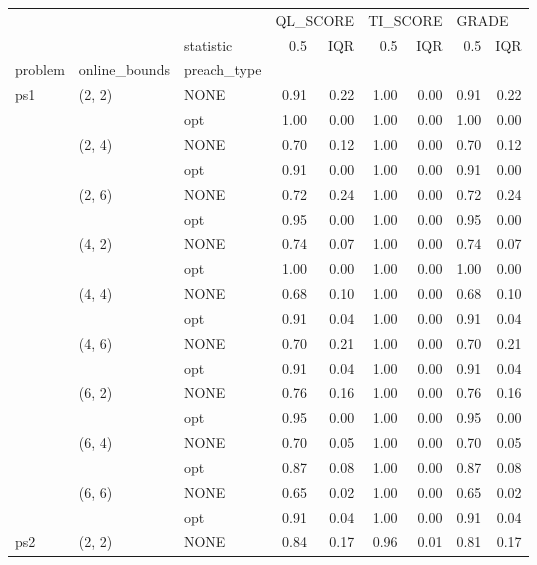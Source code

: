 \begin{tabular}{lllrrrrrr}
\toprule
    &        & {} & \multicolumn{2}{l}{QL\_SCORE} & \multicolumn{2}{l}{TI\_SCORE} & \multicolumn{2}{l}{GRADE} \\
    &        & statistic &      0.5 &  IQR &      0.5 &  IQR &   0.5 &  IQR \\
problem & online\_bounds & preach\_type &          &      &          &      &       &      \\
\midrule
ps1 & (2, 2) & NONE &     0.91 & 0.22 &     1.00 & 0.00 &  0.91 & 0.22 \\
    &        & opt &     1.00 & 0.00 &     1.00 & 0.00 &  1.00 & 0.00 \\
    & (2, 4) & NONE &     0.70 & 0.12 &     1.00 & 0.00 &  0.70 & 0.12 \\
    &        & opt &     0.91 & 0.00 &     1.00 & 0.00 &  0.91 & 0.00 \\
    & (2, 6) & NONE &     0.72 & 0.24 &     1.00 & 0.00 &  0.72 & 0.24 \\
    &        & opt &     0.95 & 0.00 &     1.00 & 0.00 &  0.95 & 0.00 \\
    & (4, 2) & NONE &     0.74 & 0.07 &     1.00 & 0.00 &  0.74 & 0.07 \\
    &        & opt &     1.00 & 0.00 &     1.00 & 0.00 &  1.00 & 0.00 \\
    & (4, 4) & NONE &     0.68 & 0.10 &     1.00 & 0.00 &  0.68 & 0.10 \\
    &        & opt &     0.91 & 0.04 &     1.00 & 0.00 &  0.91 & 0.04 \\
    & (4, 6) & NONE &     0.70 & 0.21 &     1.00 & 0.00 &  0.70 & 0.21 \\
    &        & opt &     0.91 & 0.04 &     1.00 & 0.00 &  0.91 & 0.04 \\
    & (6, 2) & NONE &     0.76 & 0.16 &     1.00 & 0.00 &  0.76 & 0.16 \\
    &        & opt &     0.95 & 0.00 &     1.00 & 0.00 &  0.95 & 0.00 \\
    & (6, 4) & NONE &     0.70 & 0.05 &     1.00 & 0.00 &  0.70 & 0.05 \\
    &        & opt &     0.87 & 0.08 &     1.00 & 0.00 &  0.87 & 0.08 \\
    & (6, 6) & NONE &     0.65 & 0.02 &     1.00 & 0.00 &  0.65 & 0.02 \\
    &        & opt &     0.91 & 0.04 &     1.00 & 0.00 &  0.91 & 0.04 \\
ps2 & (2, 2) & NONE &     0.84 & 0.17 &     0.96 & 0.01 &  0.81 & 0.17 \\

\end{tabular}
